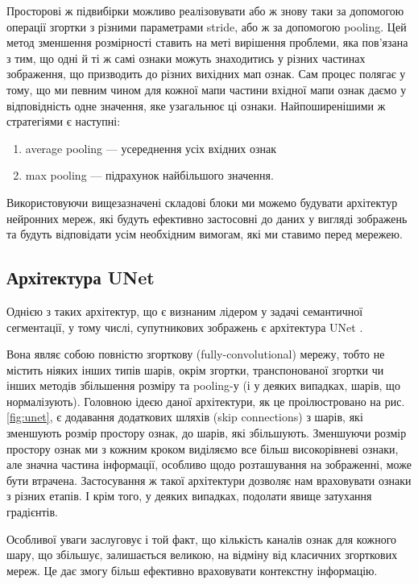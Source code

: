 Просторові ж підвибірки можливо реалізовувати або ж знову таки
за допомогою операції згортки з різними параметрами stride,
або ж за допомогою pooling. Цей метод зменшення розмірності ставить
на меті вирішення проблеми, яка пов'язана з тим, що одні й ті ж
самі ознаки можуть знаходитись у різних частинах зображення,
що призводить до різних вихідних мап ознак. Сам процес полягає у тому, що
ми певним чином для кожної мапи частини вхідної мапи ознак даємо у відповідність
одне значення, яке узагальнює ці ознаки. Найпоширенішими ж стратегіями є наступні:
\begin{enumerate}
    \item average pooling --- усереднення усіх вхідних ознак
    \item max pooling --- підрахунок найбільшого значення.
\end{enumerate}

Використовуючи вищезазначені складові блоки ми можемо
будувати архітектур нейронних мереж, які будуть ефективно застосовні
до даних у вигляді зображень та будуть відповідати усім необхідним
вимогам, які ми ставимо перед мережею.

\subsection{Архітектура UNet}

Однією з таких архітектур, що є визнаним лідером у задачі
семантичної сегментації, у тому числі, супутникових зображень є
архітектура UNet \cite{unet}.

Вона являє собою повністю згорткову (fully-convolutional) мережу, тобто
не містить ніяких інших типів шарів, окрім згортки, транспонованої згортки чи
інших методів збільшення розміру та pooling-у (і у деяких
випадках, шарів, що нормалізують). Головною ідеєю даної
архітектури, як це проілюстровано на рис. \ref{fig:unet}, є
додавання додаткових шляхів (skip connections) з шарів, які зменшують
розмір простору ознак, до шарів, які збільшують. Зменшуючи розмір простору
ознак ми з кожним кроком виділяємо все більш високорівневі
ознаки, але значна частина інформації, особливо щодо розташування
на зображенні, може бути втрачена. Застосування ж такої
архітектури дозволяє нам враховувати ознаки з різних етапів.
І крім того, у деяких випадках, подолати явище затухання градієнтів.

Особливої уваги заслуговує і той факт, що кількість каналів ознак
для кожного шару, що збільшує, залишається великою, на відміну від класичних
згорткових мереж. Це дає змогу більш ефективно враховувати контекстну
інформацію.

